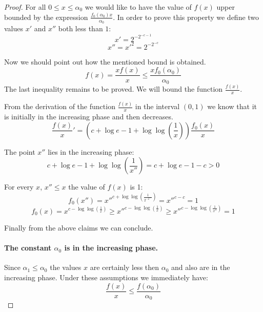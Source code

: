 \begin{proof}
For all $0 \leq x \leq \alpha_0$ we would like to have the value of $f(x)$ upper bounded by the expression $\frac{f_0(\alpha_0)x}{\alpha_0}$. In order to prove this property we define two values $x'$ and $x''$ both less than $1$:
\begin{equation}
x' = 2 ^ {-2 ^ {-c - 1}}
\end{equation}
\begin{equation}
x'' = {x'}^2 = 2 ^ {-2 ^ {-c}}
\end{equation}

Now we should point out how the mentioned bound is obtained.
\begin{equation}
f(x) = \frac{x f(x)}{x} \leq \frac{x f_0(\alpha_0)}{\alpha_0}
\end{equation}
The last inequality remains to be proved. We will bound the function $\frac{f(x)}{x}$. 

From the derivation of the function $\frac{f(x)}{x}$ in the interval $(0, 1)$ we know that it is initially in the increasing phase and then decreases.
\begin{displaymath}
\frac{f(x)}{x}' = \left(c + \log e - 1 + \log \log \left(\frac{1}{x}\right)\right)\frac{f_0(x)}{x}
\end{displaymath}

The point $x''$ lies in the increasing phase:
\begin{displaymath}
c + \log e - 1 + \log \log \left(\frac{1}{x''}\right) = c + \log e - 1 - c > 0
\end{displaymath}

For every $x$, $x'' \leq x$ the value of $f(x)$ is 1:
\begin{equation}\label{f-x-double-prime}
f_0(x'') = {x''}^{c + \log \log \left(\frac{1}{2^{-2^{-c}}}\right)} = {x''}^{c - c} = 1
\end{equation}
\begin{equation}\label{f-x-after-double-prime}
f_0(x) = x^{c - \log \log \left(\frac{1}{x}\right)} \geq {x''}^{c - \log \log \left(\frac{1}{x}\right)} \geq {x''}^{c - \log \log \left(\frac{1}{x''}\right)} = 1
\end{equation}

Finally from the above claims we can conclude.
\paragraph{The constant $\alpha_0$ is in the increasing phase.}
Since $\alpha_1 \leq \alpha_0$ the values $x$ are certainly less then $\alpha_0$ and also are in the increasing phase. Under these assumptions we immediately have:
\begin{equation}
\frac{f(x)}{x} \leq \frac{f(\alpha_0)}{\alpha_0}
\end{equation}


\end{proof}
